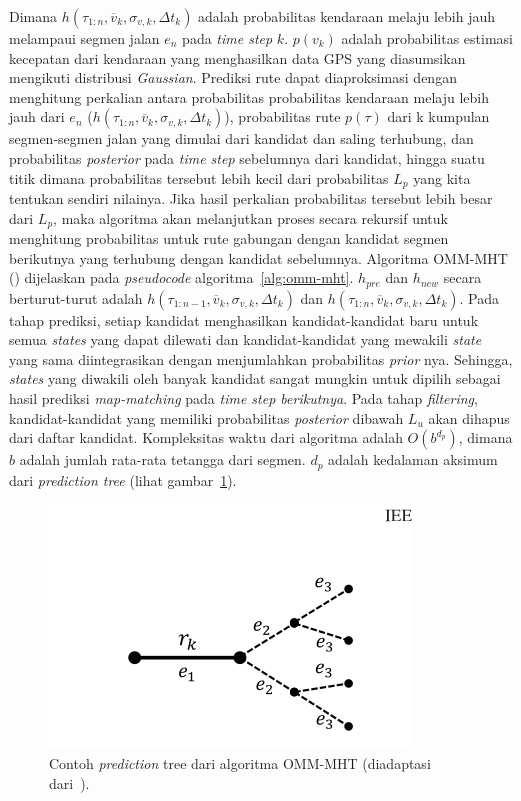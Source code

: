 Dimana $h(\tau_{1:n},\overline{v}_k,\sigma_{v,k},\Delta t_k)$ adalah probabilitas kendaraan melaju lebih jauh melampaui segmen jalan $e_n$ pada \textit{time step } $k$. $p(v_k)$ adalah probabilitas estimasi kecepatan dari kendaraan yang menghasilkan data GPS yang diasumsikan mengikuti distribusi \textit{Gaussian}. Prediksi rute dapat diaproksimasi dengan menghitung perkalian antara probabilitas probabilitas kendaraan melaju lebih jauh dari $e_n$ ($h(\tau_{1:n},\overline{v}_k,\sigma_{v,k},\Delta t_k)$), probabilitas rute $p(\tau)$ dari k kumpulan segmen-segmen jalan yang  dimulai dari kandidat dan saling terhubung, dan probabilitas \textit{posterior} pada \textit{time step} sebelumnya dari kandidat, hingga suatu titik dimana probabilitas tersebut lebih kecil dari probabilitas $L_p$ yang kita tentukan sendiri nilainya. Jika hasil perkalian probabilitas tersebut lebih besar dari $L_p$, maka algoritma akan melanjutkan proses secara rekursif untuk menghitung probabilitas untuk rute gabungan dengan kandidat segmen berikutnya yang terhubung dengan kandidat sebelumnya.  Algoritma OMM-MHT (\cite{Taguchi2019}) dijelaskan pada \textit{pseudocode} algoritma~\ref{alg:omm-mht}. $h_{pre}$ dan $h_{new}$ secara berturut-turut adalah $h(\tau_{1:n-1}, \overline{v}_k,\sigma_{v,k},\Delta t_k)$ dan $h(\tau_{1:n}, \overline{v}_k,\sigma_{v,k},\Delta t_k)$. Pada tahap prediksi, setiap kandidat menghasilkan kandidat-kandidat baru untuk semua \textit{states} yang dapat dilewati dan kandidat-kandidat yang mewakili \textit{state} yang sama diintegrasikan dengan menjumlahkan probabilitas \textit{prior} nya. Sehingga, \textit{states} yang diwakili oleh banyak kandidat sangat mungkin untuk dipilih sebagai hasil prediksi \textit{map-matching} pada \textit{time step berikutnya}. Pada tahap \textit{filtering}, kandidat-kandidat yang memiliki probabilitas \textit{posterior} dibawah $L_u$ akan dihapus dari daftar kandidat. Kompleksitas waktu dari algoritma adalah $O(b^{d_p})$, dimana $b$ adalah jumlah rata-rata tetangga dari segmen. $d_p$ adalah kedalaman aksimum dari \textit{prediction tree} (lihat gambar~\ref{fig:prediction-tree-omm}).


\begin{figure}[H]
    \centering
    \includegraphics[]{figures/prediction_tree_omm.png}
    \caption{Contoh \textit{prediction} tree dari algoritma OMM-MHT (diadaptasi dari~\cite{Taguchi2019}).}
    \label{fig:prediction-tree-omm}
\end{figure}




